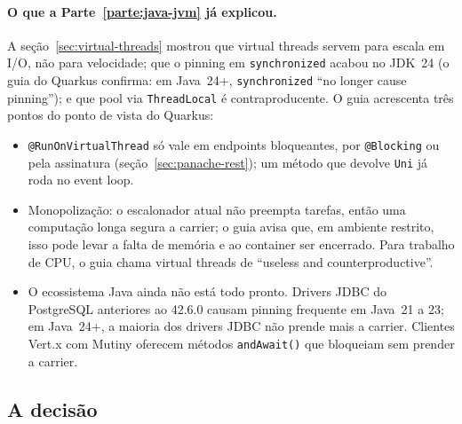 \paragraph{O que a Parte~\ref{parte:java-jvm} já explicou.}
A seção~\ref{sec:virtual-threads} mostrou que virtual threads servem para
escala em I/O, não para velocidade; que o pinning em
\texttt{synchronized} acabou no JDK~24 (o guia do Quarkus confirma: em
Java~24+, \texttt{synchronized} \enquote{no longer cause pinning}); e
que pool via \texttt{ThreadLocal} é contraproducente. O guia acrescenta
três pontos do ponto de vista do Quarkus:
\begin{itemize}
\item \texttt{@RunOnVirtualThread} só vale em endpoints bloqueantes, por
  \texttt{@Blocking} ou pela assinatura (seção~\ref{sec:panache-rest});
  um método que devolve \texttt{Uni} já roda no event loop.
\item Monopolização: o escalonador atual não preempta tarefas, então uma
  computação longa segura a carrier; o guia avisa que, em ambiente
  restrito, isso pode levar a falta de memória e ao container ser
  encerrado. Para trabalho de CPU, o guia chama virtual threads de
  \enquote{useless and counterproductive}.
\item O ecossistema Java ainda não está todo pronto. Drivers JDBC do
  PostgreSQL anteriores ao 42.6.0 causam pinning frequente em Java~21 a
  23; em Java~24+, a maioria dos drivers JDBC não prende mais a carrier.
  Clientes Vert.x com Mutiny oferecem métodos \texttt{andAwait()} que
  bloqueiam sem prender a carrier.
\end{itemize}

\subsection*{A decisão}

